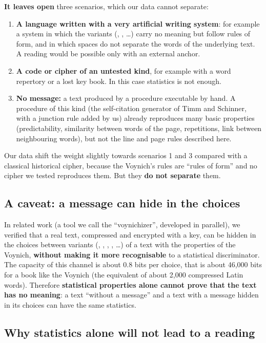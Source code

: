 \noindent\textbf{It leaves open} three scenarios, which our data cannot separate:
\begin{enumerate}
\item \textbf{A language written with a very artificial writing system}: for example a system in which the variants
  (, , \ldots) carry no meaning but follow rules of form, and in which spaces do not separate the
  words of the underlying text. A reading would be possible only with an external anchor.
\item \textbf{A code or cipher of an untested kind}, for example with a word repertory or a lost key book. In this case
  statistics is not enough.
\item \textbf{No message:} a text produced by a procedure executable by hand. A procedure of this kind (the
  self-citation generator of Timm and Schinner, with a junction rule added by us) already reproduces many basic properties
  (predictability, similarity between words of the page, repetitions, link between neighbouring words), but not the line
  and page rules described here.
\end{enumerate}
Our data shift the weight slightly towards scenarios 1 and 3 compared with a classical historical cipher, because the
Voynich's rules are ``rules of form'' and no cipher we tested reproduces them. But they \textbf{do not separate} them.

\subsection{A caveat: a message can hide in the choices}

In related work (a tool we call the ``voynichizer'', developed in parallel), we verified that a real text, compressed and
encrypted with a key, can be hidden in the choices between variants (, , , ,
\ldots) of a text with the properties of the Voynich, \textbf{without making it more recognisable} to a statistical
discriminator. The capacity of this channel is about 0.8 bits per choice, that is about 46{,}000 bits for a book like the
Voynich (the equivalent of about 2{,}000 compressed Latin words). Therefore \textbf{statistical properties alone cannot
prove that the text has no meaning}: a text ``without a message'' and a text with a message hidden in its choices can have
the same statistics.

\subsection{Why statistics alone will not lead to a reading}

